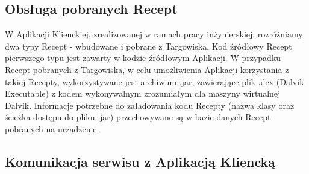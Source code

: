 \documentclass[11pt,a4paper,polish,thesis]{dcsbook}
\begin{document}
\subsection {Obsługa pobranych Recept}
W Aplikacji Klienckiej, zrealizowanej w ramach pracy inżynierskiej, rozróżniamy dwa typy Recept - wbudowane i pobrane z Targowiska. Kod źródłowy Recept pierwszego typu jest zawarty w kodzie źródłowym Aplikacji. W przypadku Recept pobranych z Targowiska, w celu umożliwienia Aplikacji korzystania z takiej Recepty, wykorzystywane jest archiwum .jar, zawierające plik .dex (Dalvik Executable) z kodem wykonywalnym  zrozumiałym dla maszyny wirtualnej Dalvik. Informacje potrzebne do załadowania kodu Recepty (nazwa klasy oraz ścieżka dostępu do pliku .jar) przechowywane są w bazie danych Recept pobranych na urządzenie. 
\subsection{Komunikacja serwisu z Aplikacją Kliencką}
\end{document}

